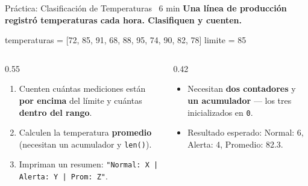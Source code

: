 \documentclass[aspectratio=169, 11pt]{beamer}
\begin{document}
\begin{frame}[fragile,shrink=25]{Práctica: Clasificación de Temperaturas \hfill
    {\normalsize\color{arcaRed}\faClock\ 6 min}}
  \vspace{-6pt}
  {\small\color{arcaDark}\bfseries
    Una línea de producción registró temperaturas cada hora.
    Clasifiquen y cuenten.}

  \vspace{4pt}
  \begin{pyblock}
temperaturas = [72, 85, 91, 68, 88, 95, 74, 90, 82, 78]
limite = 85
  \end{pyblock}

  \vspace{6pt}
  \begin{columns}[T]
    \begin{column}{0.55\textwidth}
      {\footnotesize
      \begin{enumerate}\setlength{\itemsep}{5pt}
        \item Cuenten cuántas mediciones están
              \textbf{por encima} del límite y
              cuántas \textbf{dentro del rango}.
        \item Calculen la temperatura \textbf{promedio}
              (necesitan un acumulador y \texttt{len()}).
        \item Impriman un resumen:
              \texttt{"Normal: X | Alerta: Y | Prom: Z"}.
      \end{enumerate}
      }
    \end{column}

    \begin{column}{0.42\textwidth}
      {\footnotesize\color{textMuted}
      \begin{itemize}\setlength{\itemsep}{4pt}
        \item[{\color{arcaRed}\scriptsize\faLightbulb}]
          Necesitan \textbf{dos contadores}
          y \textbf{un acumulador} --- los tres
          inicializados en \texttt{0}.
        \item[{\color{arcaRed}\scriptsize\faLightbulb}]
          Resultado esperado:
          Normal: 6, Alerta: 4,
          Promedio: 82.3.
      \end{itemize}
      }
    \end{column}
  \end{columns}
\end{frame}
\end{document}
